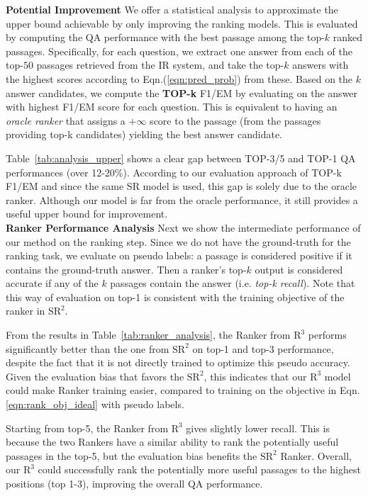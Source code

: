 \documentclass[letterpaper]{article} %
\begin{document}
\noindent\textbf{Potential Improvement}\quad
We offer a statistical analysis to approximate the upper bound achievable by only improving the ranking models.
This is evaluated by computing the QA performance with the best passage among the top-$k$ ranked passages.
Specifically, for each question, we extract one answer from each of the top-$50$ passages retrieved from the IR system, and take the top-$k$ answers with the highest scores according to Eqn.(\ref{eqn:pred_prob}) from these.
Based on the $k$ answer candidates, we compute the \textbf{TOP-k} F1/EM by evaluating on the answer with highest F1/EM score for each question. This is equivalent to having an \emph{oracle ranker} that assigns a $+\infty$ score to the passage (from the passages providing top-k candidates) yielding the best answer candidate.

Table~\ref{tab:analysis_upper} shows a clear gap between TOP-3/5 and TOP-1 QA performances (over 12-20\%). According to our evaluation approach of TOP-k F1/EM and since the same SR model is used, this gap is
solely due to
the oracle ranker. Although our model is far from the oracle performance, it still provides a useful upper bound for improvement. \\

\noindent\textbf{Ranker Performance Analysis}\quad
Next we show the intermediate performance of our method on the ranking step.
Since we do not have the ground-truth for the ranking task, we evaluate on pseudo labels: a passage is considered  positive if it contains the ground-truth answer. Then a ranker's top-$k$ output is considered accurate if any of the $k$ passages contain the answer (i.e. \emph{top-k recall}). 
Note that this way of evaluation on top-1 is consistent with the training objective of the ranker in $\text{SR}^2$.

From the results in Table~\ref{tab:ranker_analysis}, the Ranker from $\text{R}^3$ performs significantly better than the one from $\text{SR}^2$ on top-1 and top-3 performance, despite the fact that it is not directly trained to optimize this pseudo accuracy. Given the evaluation bias that favors the $\text{SR}^2$, this indicates that our $\text{R}^3$ model could make Ranker training easier, compared to training on the objective in Eqn.\ref{eqn:rank_obj_ideal} with pseudo labels.

{Starting from top-5, the Ranker from $\text{R}^3$ gives slightly lower recall. This is because the two Rankers have a similar ability to rank the potentially useful passages in the top-5, but the evaluation bias benefits the $\text{SR}^2$ Ranker. 
Overall, our $\text{R}^3$ could successfully rank the potentially more useful passages to the highest positions (top 1-3), improving the overall QA performance.}
\end{document}
